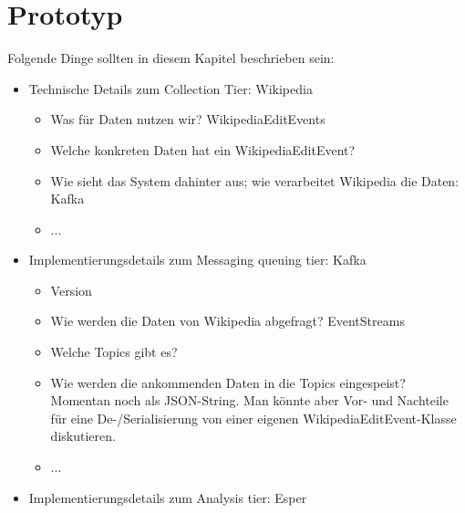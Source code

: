 \section{Prototyp}
Folgende Dinge sollten in diesem Kapitel beschrieben sein:

\begin{itemize}
    \item Technische Details zum Collection Tier: Wikipedia
    \begin{itemize}
        \item Was für Daten nutzen wir? WikipediaEditEvents
        \item Welche konkreten Daten hat ein WikipediaEditEvent?
        \item Wie sieht das System dahinter aus; wie verarbeitet Wikipedia die Daten: Kafka
        \item ...
    \end{itemize}
    \item Implementierungsdetails zum Messaging queuing tier: Kafka
    \begin{itemize}
        \item Version
        \item Wie werden die Daten von Wikipedia abgefragt? EventStreams
        \item Welche Topics gibt es?
        \item Wie werden die ankommenden Daten in die Topics eingespeist? Momentan noch als JSON-String.
            Man könnte aber Vor- und Nachteile für eine De-/Serialisierung von einer eigenen WikipediaEditEvent-Klasse diskutieren.
        \item ...
    \end{itemize}
    \item Implementierungsdetails zum Analysis tier: Esper
\end{itemize}
